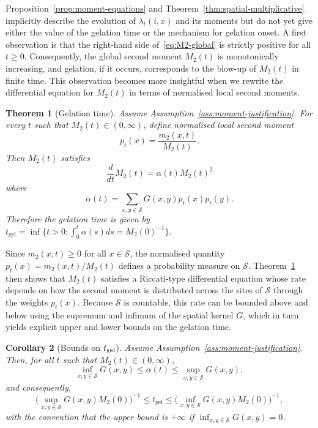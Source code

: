 \documentclass[12pt,twoside]{article}
\newtheorem{thm}{Theorem}[section]
\newtheorem{cor}[thm]{Corollary}
\begin{document}
Proposition~\ref{prop:moment-equations} and Theorem~\ref{thm:spatial-multiplicative}
implicitly describe the evolution of $\lambda_t(i,x)$ and its moments but do not yet give either the value of the
gelation time or the mechanism for gelation onset.  A first observation is that the right-hand side of~\eqref{eq:M2-global} is strictly
positive for all $t\geq 0$.  Consequently, the global second moment $M_2(t)$ is monotonically increasing, and
gelation, if it occurs, corresponds to the blow-up of $M_2(t)$ in finite time. This observation becomes more insightful when we rewrite the differential equation for $M_2(t)$ in terms of normalised local second moments.
\begin{thm}[Gelation time]
\label{thm:riccati-general}
Assume Assumption~\ref{ass:moment-justification}.
For every $t$ such that $M_2(t)\in(0,\infty)$, define normalised local second moment
\begin{equation}\label{eq:pt}
p_t(x)=\frac{m_2(x,t)}{M_2(t)}.
\end{equation}
Then $M_2(t)$ satisfies 
\begin{equation}
\label{eq:Riccati-general}
\frac{d}{dt}M_2(t)=\alpha(t)M_2(t)^2
\end{equation}
where
\begin{equation}\label{eq:alfa}
\alpha(t)=\sum_{x,y\in\mathcal S} G(x,y)p_t(x)p_t(y).
\end{equation}
Therefore the gelation time is given by
$
t_{\mathrm{gel}}
=
\inf
\Big\{
t>0:\int_0^t\alpha(s)ds=M_2(0)^{-1}
\Big\}.
$
\end{thm}
Since $m_2(x,t)\ge 0$ for all $x\in\mathcal S$, the normalised quantity
$p_t(x)=m_2(x,t)/M_2(t)$ defines a probability measure on $\mathcal S$.
Theorem~\ref{thm:riccati-general} then shows that $M_2(t)$ satisfies a
Riccati-type differential equation whose rate depends on how the second
moment is distributed across the sites of $\mathcal S$ through the weights
$p_t(x)$.   Because $\mathcal S$ is countable, this rate can be bounded above and below
using the supremum and infimum of the spatial kernel $G$, which in turn
yields explicit upper and lower bounds on the gelation time.
\begin{cor}[Bounds on $t_{\rm gel}$]
\label{cor:sharp-bounds} Assume
Assumption~\ref{ass:moment-justification}. Then, for all $t$ such that
$M_2(t)\in(0,\infty)$,
\begin{equation}\label{eq:alpha_bound}
\inf_{x,y\in\mathcal S} G(x,y)\le \alpha(t)\le \sup_{x,y\in\mathcal S} G(x,y),
\end{equation}
and consequently,
\begin{equation}\label{bounds_Tgel}
\big(\sup_{x,y\in\mathcal S} G(x,y)M_2(0)\big)^{-1} \le t_{\mathrm{gel}} \le \big(\inf_{x,y\in\mathcal S} G(x,y)M_2(0)\big)^{-1},
\end{equation}
with the convention that the upper bound is $+\infty$ if
$\inf_{x,y\in\mathcal S} G(x,y)=0$. 
\end{cor}
\end{document}
